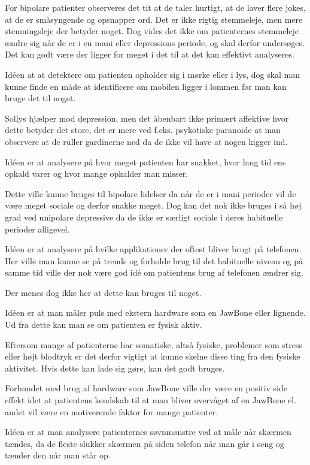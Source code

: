\begin{description}[style=nextline]
	For bipolare patienter observeres det tit at de taler hurtigt, at de laver flere jokes, at de er småsyngende og opsnapper ord. Det er ikke rigtig stemmeleje, men mere stemningsleje der betyder noget. 
	Dog vides det ikke om patienternes stemmeleje ændre sig når de er i en mani eller depressions periode, og skal derfor undersøges.
	Det kan godt være der ligger for meget i det til at det kan effektivt analyseres. 
\item[Lys]
	Idéen at at detektere om patienten opholder sig i mørke eller i lys, dog skal man kunne finde en måde at identificere om mobilen ligger i lommen før man kan bruge det til noget.
	
	Sollys hjælper mod depression, men det åbenbart ikke primært affektive hvor dette betyder det store, det er mere ved f.eks. psykotiske paranoide at man observere at de ruller gardinerne ned da de ikke vil have at nogen kigger ind. 
\item[Opkaldsoversigt]
	Idéen er at analysere på hvor meget patienten har snakket, hvor lang tid ens opkald varer og hvor mange opkalder man misser.
	
	Dette ville kunne bruges til bipolare lidelser da når de er i mani perioder vil de være meget sociale og derfor snakke meget. 
	Dog kan det nok ikke bruges i så høj grad ved unipolare depressive da de ikke er særligt sociale i deres habituelle perioder alligevel.
\item[Applikation brug]
	Idéen er at analysere på hvilke applikationer der oftest bliver brugt på telefonen. Her ville man kunne se på trends og forholde brug til det habituelle niveau og på samme tid ville der nok være god idé om patientens brug af telefonen ændrer sig.
	
	Der menes dog ikke her at dette kan bruges til noget.
\item[Puls]
	Idéen er at man måler puls med ekstern hardware som en JawBone eller lignende. Ud fra dette kan man se om patienten er fysisk aktiv.
	
	Eftersom mange af patienterne har somatiske, altså fysiske, problemer som stress eller højt blodtryk er det derfor vigtigt at kunne skelne disse ting fra den fysiske aktivitet.
	Hvis dette kan lade sig gøre, kan det godt bruges. 
	
	Forbundet med brug af hardware som JawBone ville der være en positiv side effekt idet at patientens kendskab til at man bliver overvåget af en JawBone el. andet vil være en motiverende faktor for mange patienter. 
\item[Søvnmønstre]
	Idéen  er at man analysere patienternes søvnmønstre ved at måle når skærmen tændes, da de fleste slukker skærmen på siden telefon når man går i seng og tænder den når man står op. 
	

\end{description}
